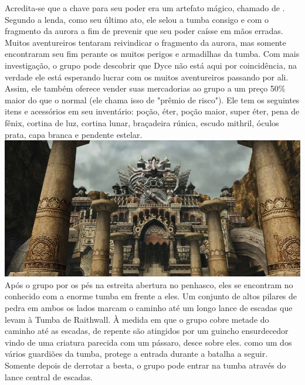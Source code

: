 Acredita-se que a chave para seu poder era um artefato mágico, chamado de .
Segundo a lenda, como seu último ato, ele selou a tumba consigo e com o fragmento da aurora a fim de prevenir que seu poder caísse em mãos erradas.
Muitos aventureiros tentaram reivindicar o fragmento da aurora, mas somente encontraram seu fim perante os muitos perigos e armadilhas da tumba.
Com mais investigação, o grupo pode descobrir que Dyce não está aqui por coincidência, na verdade ele está esperando lucrar com os muitos aventureiros passando por ali.
Assim, ele também oferece vender suas mercadorias ao grupo a um preço 50\% maior do que o normal (ele chama isso de "prêmio de risco").
Ele tem os seguintes itens e acessórios em seu inventário: poção, éter, poção maior, super éter, pena de fênix, cortina de luz, cortina lunar, braçadeira rúnica, escudo mithril, óculos prata, capa branca e pendente estelar.
%
\vfill
%
\includegraphics[width=\columnwidth]{./art/tombofraithwall/tomb2.jpg}
%
\vfill
%
Após o grupo por os pés na estreita abertura no penhasco, eles se encontram no conhecido  com a enorme tumba em frente a eles.
Um conjunto de altos pilares de pedra em ambos os lados marcam o caminho até um longo lance de escadas que levam à Tumba de Raithwall.
À medida em que o grupo cobre metade do caminho até as escadas, de repente são atingidos por um guincho ensurdecedor vindo de uma criatura parecida com um pássaro, desce sobre eles.
 como um dos vários guardiões da tumba, protege a entrada durante a batalha a seguir.
Somente depois de derrotar a besta, o grupo pode entrar na tumba através do lance central de escadas.
%
\vfill
%
